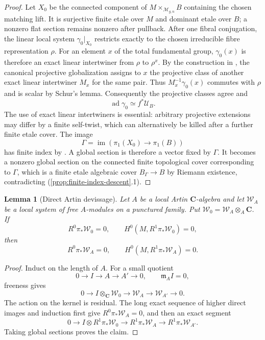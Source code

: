 \documentclass[11pt]{article}
\newtheorem{lemma}[theorem]{Lemma}
\theoremstyle{definition}
\newcommand{\C}{\mathbf C}
\newcommand{\Mcal}{\mathcal M}
\newcommand{\Ucal}{\mathcal U}
\newcommand{\Wcal}{\mathcal W}
\newcommand{\ad}{\operatorname{ad}}
\begin{document}
\begin{proof}
Let $X_0$ be the connected component of
$M\times_{\Mcal_{g,n}}B$ containing the chosen matching lift.  It is
surjective finite etale over $M$ and dominant etale over $B$; a nonzero flat
section remains nonzero after pullback.  After one fibral conjugation, the linear local system
$\gamma_0|_{X_0}$ restricts exactly to the chosen irreducible fibre
representation $\rho$.  For an element $x$ of the total fundamental group,
$\gamma_0(x)$ is therefore an exact linear intertwiner from $\rho$ to
$\rho^x$.  By the construction in \cite[Lemma 2.2.2]{LLCan}, the canonical
projective globalization assigns to $x$ the projective class of another
exact linear intertwiner $M_x$ for the same pair.  Thus
$M_x^{-1}\gamma_0(x)$ commutes with $\rho$ and is scalar by Schur's lemma.
Consequently the projective classes agree and
\[
 \ad\gamma_0\simeq f^*\Ucal_B.
\]
The use of exact linear intertwiners is essential: arbitrary projective
extensions may differ by a finite self-twist, which can alternatively be
killed after a further finite etale cover.
The image
\[
 \Gamma=\operatorname{im}(\pi_1(X_0)\to\pi_1(B))
\]
has finite index by \cite[Lemma 2.1.4]{LLCan}.  A global section is therefore
a vector fixed by $\Gamma$.  It becomes a nonzero global section on the
connected finite topological cover corresponding to $\Gamma$, which is a
finite etale algebraic cover $B_\Gamma\to B$ by Riemann existence,
contradicting (\ref{prop:finite-index-descent}.1).
\end{proof}

\begin{lemma}[Direct Artin devissage]\label{lem:artin-devissage}
Let $A$ be a local Artin $\C$-algebra and let $\Wcal_A$ be a local system of
free $A$-modules on a punctured family.  Put
$\Wcal_0=\Wcal_A\otimes_A\C$.  If
\[
 R^0\pi_*\Wcal_0=0,
 \qquad
 H^0(M,R^1\pi_*\Wcal_0)=0,
\]
then
\[
 R^0\pi_*\Wcal_A=0,
 \qquad
 H^0(M,R^1\pi_*\Wcal_A)=0.
\]
\end{lemma}

\begin{proof}
Induct on the length of $A$.  For a small quotient
\[
 0\to I\to A\to A'\to0,
 \qquad \mathfrak m_AI=0,
\]
freeness gives
\[
 0\to I\otimes_\C\Wcal_0\to\Wcal_A\to\Wcal_{A'}\to0.
\]
The action on the kernel is residual.  The long exact sequence of higher
direct images and induction first give $R^0\pi_*\Wcal_A=0$, and then an exact
segment
\[
 0\to I\otimes R^1\pi_*\Wcal_0
 \to R^1\pi_*\Wcal_A
 \to R^1\pi_*\Wcal_{A'}.
\]
Taking global sections proves the claim.
\end{proof}
\end{document}
